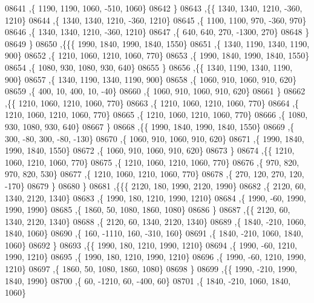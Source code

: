 \begin{DoxyCode}
08641     ,\{  1190,  1190,  1060,  -510,  1060\}
08642     \}
08643    ,\{\{  1340,  1340,  1210,  -360,  1210\}
08644     ,\{  1340,  1340,  1210,  -360,  1210\}
08645     ,\{  1100,  1100,   970,  -360,   970\}
08646     ,\{  1340,  1340,  1210,  -360,  1210\}
08647     ,\{   640,   640,   270, -1300,   270\}
08648     \}
08649    \}
08650   ,\{\{\{  1990,  1840,  1990,  1840,  1550\}
08651     ,\{  1340,  1190,  1340,  1190,   900\}
08652     ,\{  1210,  1060,  1210,  1060,   770\}
08653     ,\{  1990,  1840,  1990,  1840,  1550\}
08654     ,\{  1080,   930,  1080,   930,   640\}
08655     \}
08656    ,\{\{  1340,  1190,  1340,  1190,   900\}
08657     ,\{  1340,  1190,  1340,  1190,   900\}
08658     ,\{  1060,   910,  1060,   910,   620\}
08659     ,\{   400,    10,   400,    10,   -40\}
08660     ,\{  1060,   910,  1060,   910,   620\}
08661     \}
08662    ,\{\{  1210,  1060,  1210,  1060,   770\}
08663     ,\{  1210,  1060,  1210,  1060,   770\}
08664     ,\{  1210,  1060,  1210,  1060,   770\}
08665     ,\{  1210,  1060,  1210,  1060,   770\}
08666     ,\{  1080,   930,  1080,   930,   640\}
08667     \}
08668    ,\{\{  1990,  1840,  1990,  1840,  1550\}
08669     ,\{   300,   -80,   300,   -80,  -130\}
08670     ,\{  1060,   910,  1060,   910,   620\}
08671     ,\{  1990,  1840,  1990,  1840,  1550\}
08672     ,\{  1060,   910,  1060,   910,   620\}
08673     \}
08674    ,\{\{  1210,  1060,  1210,  1060,   770\}
08675     ,\{  1210,  1060,  1210,  1060,   770\}
08676     ,\{   970,   820,   970,   820,   530\}
08677     ,\{  1210,  1060,  1210,  1060,   770\}
08678     ,\{   270,   120,   270,   120,  -170\}
08679     \}
08680    \}
08681   ,\{\{\{  2120,   180,  1990,  2120,  1990\}
08682     ,\{  2120,    60,  1340,  2120,  1340\}
08683     ,\{  1990,   180,  1210,  1990,  1210\}
08684     ,\{  1990,   -60,  1990,  1990,  1990\}
08685     ,\{  1860,    50,  1080,  1860,  1080\}
08686     \}
08687    ,\{\{  2120,    60,  1340,  2120,  1340\}
08688     ,\{  2120,    60,  1340,  2120,  1340\}
08689     ,\{  1840,  -210,  1060,  1840,  1060\}
08690     ,\{   160, -1110,   160,  -310,   160\}
08691     ,\{  1840,  -210,  1060,  1840,  1060\}
08692     \}
08693    ,\{\{  1990,   180,  1210,  1990,  1210\}
08694     ,\{  1990,   -60,  1210,  1990,  1210\}
08695     ,\{  1990,   180,  1210,  1990,  1210\}
08696     ,\{  1990,   -60,  1210,  1990,  1210\}
08697     ,\{  1860,    50,  1080,  1860,  1080\}
08698     \}
08699    ,\{\{  1990,  -210,  1990,  1840,  1990\}
08700     ,\{    60, -1210,    60,  -400,    60\}
08701     ,\{  1840,  -210,  1060,  1840,  1060\}

\end{DoxyCode}

